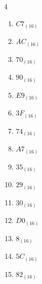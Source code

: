 \begin{multicols}{4}
\begin{enumerate}
        \phantom{$=79$}

  \item $C7_{(16)}$

        \phantom{$=199$}

  \item $AC_{(16)}$

        \phantom{$=172$}

  \item $70_{(16)}$

        \phantom{$=112$}

  \item $90_{(16)}$

        \phantom{$=144$}

  \item $E9_{(16)}$

        \phantom{$=233$}

\columnbreak %

  \item $3F_{(16)}$

        \phantom{$=63$}

  \item $74_{(16)}$

        \phantom{$=116$}

  \item $A7_{(16)}$

        \phantom{$=167$}

  \item $35_{(16)}$

        \phantom{$=53$}

  \item $29_{(16)}$

        \phantom{$=41$}

  \item $30_{(16)}$

        \phantom{$=48$}

  \item $D0_{(16)}$

        \phantom{$=208$}

  \item $8_{(16)}$

        \phantom{$=8$}

  \item $5C_{(16)}$

        \phantom{$=92$}

  \item $82_{(16)}$

        \phantom{$=130$}


\end{enumerate}
\end{multicols}
